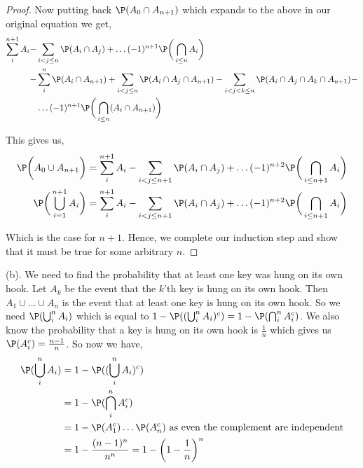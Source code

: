\documentclass[a4paper]{report}
\begin{document}
\begin{proof}
Now putting back $\P(A_0 \cap A_{n + 1})$ which expands to the above in our original equation we get,  
\begin{align*}
    \sum_{i}^{n + 1} A_i  -&\sum_{i < j \le n} \P(A_i \cap A_j) + \dots (-1)^{n + 1} \P\bigg (\bigcap_{i \le n} A_i \bigg ) \\
    -&\sum_{i}^{n} \P( A_i \cap A_{n + 1})  +\sum_{i < j \le n} \P(A_i \cap A_j \cap A_{n + 1}) - \sum_{i < j < k \le n} \P(A_i \cap A_j \cap A_k \cap A_{n + 1})- \\ & \dots (-1)^{n + 1} \P\bigg (\bigcap_{i \le n} (A_i \cap A_{n + 1}) \bigg )\\
\end{align*}

This gives us,
\begin{align*}
     \P \bigg (  A_0  \cup A_{n + 1}\bigg )  &=  \sum_{i}^{n + 1} A_i  -\sum_{i < j \le n + 1} \P(A_i \cap A_j) + \dots (-1)^{n + 2} \P\bigg (\bigcap_{i \le n + 1} A_i \bigg )\\
     \P \bigg (  \bigcup_{i = 1}^{n + 1} A_i \bigg )  &= \sum_{i}^{n + 1} A_i  -\sum_{i < j \le n + 1} \P(A_i \cap A_j) + \dots (-1)^{n + 2} \P\bigg (\bigcap_{i \le n + 1} A_i \bigg )
\end{align*}

Which is the case for $n + 1$. Hence, we complete our induction step and show that it must be true for some arbitrary  $n$.

\end{proof}


(b). We need to find the probability that at least one key was hung on its own hook. Let $ A_k$ be the event that the $k$'th key is hung on its own hook. Then  $A_1 \cup \dots \cup A_n$ is the event that at least one key is hung on its own hook. So we need $\P(\bigcup_i^{n} A_i)$ which is equal to $1 - \P((\bigcup_i^{n} A_i)^{c}) = 1 - \P(\bigcap_i^{n} A_i^{c})$. We also know the probability that a key is hung on its own hook is $\frac{1}{n}$ which gives us $\P(A_i^{c}) =  \frac{n - 1}{n}$. So now we have, 
\begin{align*}
    \P(\bigcup_i^{n} A_i) &= 1 - \P((\bigcup_i^{n} A_i)^{c})\\
                          &=1 - \P(\bigcap_i^{n} A_i^{c})\\
                          &= 1 - \P(A_1^{c})\dots \P(A_n^{c}) \text{ as even the complement are independent}\\
                          &= 1 - \frac{(n - 1)^{n}}{n^{n}} = 1 - \bigg (1 - \frac{1}{n} \bigg)^{n}
\end{align*}
\end{document}
